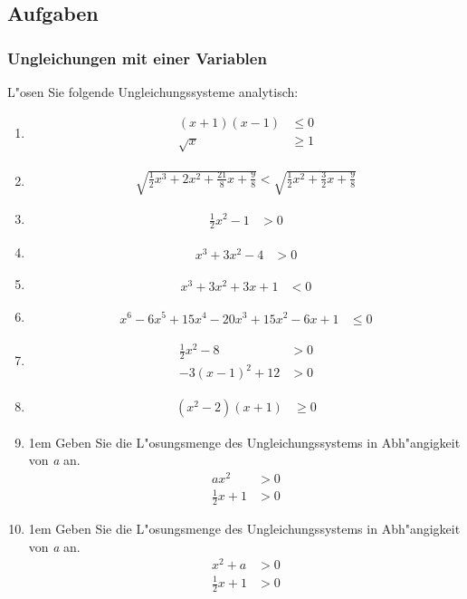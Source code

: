 \subsection{Aufgaben}

\subsubsection{Ungleichungen mit einer Variablen}
L"osen Sie folgende Ungleichungssysteme analytisch:
\begin{enumerate}\abovedisplayskip-1em
\item{ \begin{align*}(x+1)(x-1) &\leq 0\\ \sqrt{x} &\geq 1\end{align*}}
\item{ \begin{align*}\sqrt{\frac{1}{2}x^3 +2x^2 +\frac{21}{8}x + \frac{9}{8}} < \sqrt{\frac{1}{2}x^2 + \frac{3}{2}x+\frac{9}{8}} \end{align*} }
\item{ \begin{align*}\frac{1}{2}x^2-1 &> 0\end{align*}}
\item{ \begin{align*}x^3 +3x^2 -4 &> 0\end{align*}}
\item{ \begin{align*}x^3 +3x^2 +3x +1 &< 0\end{align*}}
\item{ \begin{align*}x^6 -6x^5 + 15x^4 -20x^3 +15x^2 -6x +1 &\leq 0\end{align*}}
\item{ \begin{align*}\frac{1}{2}x^2 -8 &> 0\\-3(x-1)^2 +12 &> 0\end{align*}}
\item{ \begin{align*}(x^2-2)(x+1) &\geq 0\end{align*}}
\item{\abovedisplayskip1em Geben Sie die L"osungsmenge des Ungleichungssystems in Abh"angigkeit von \textit{a} an.\begin{align*}ax^2 &> 0\\ \frac{1}{2}x + 1 &> 0\end{align*}}
\item{\abovedisplayskip1em Geben Sie die L"osungsmenge des Ungleichungssystems in Abh"angigkeit von \textit{a} an. \begin{align*}x^2 + a &> 0\\ \frac{1}{2}x +1 &> 0\end{align*}}

\end{enumerate}
